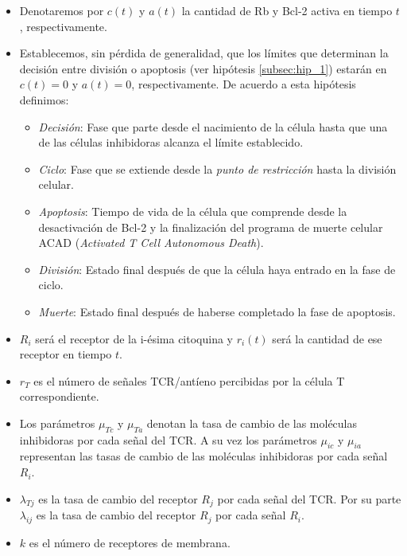 \begin{itemize}
	\item Denotaremos por \textit{$c(t)$} y \textit{$a(t)$} la cantidad de Rb y Bcl-2 activa en tiempo $t$, respectivamente.

	\item Establecemos, sin pérdida de generalidad, que los límites que determinan la decisión entre división o apoptosis (ver hipótesis \ref{subsec:hip_1}) estarán en $c(t)=0$ y $a(t)=0$, respectivamente. De acuerdo a esta hipótesis definimos: 
	
	\begin{itemize}
		\item \textit{Decisión}: Fase que parte desde el nacimiento de la célula hasta que una de las células inhibidoras alcanza el límite establecido.
		
		\item \textit{Ciclo}: Fase que se extiende desde la \textit{punto de restricción} hasta la división celular.
		
		\item \textit{Apoptosis}: Tiempo de vida de la célula que comprende desde la desactivación de Bcl-2 y la finalización del programa de muerte celular ACAD (\textit{Activated T Cell Autonomous Death}).
		
		\item \textit{División}: Estado final después de que la célula haya entrado en la fase de ciclo.
		
		\item \textit{Muerte}: Estado final después de haberse completado la fase de apoptosis.
	\end{itemize}

	\item \textit{$R_{i}$} será el receptor de la i-ésima citoquina y \textit{$r_{i}(t)$} será la cantidad de ese receptor en tiempo $t$. 
	\item $r_{T}$ es el número de señales TCR/antíeno percibidas por la célula T correspondiente.
	
	\item Los parámetros $\mu_{Tc}$ y $\mu_{Ta}$ denotan la tasa de cambio de las moléculas inhibidoras por cada señal del TCR. A su vez los parámetros $\mu_{ic}$ y $\mu_{ia}$ representan las tasas de cambio de las moléculas inhibidoras por cada señal $R_i$.
	
	\item $\lambda_{Tj}$ es la tasa de cambio del receptor $R_{j}$ por cada señal del TCR. Por su parte $\lambda_{ij}$ es la tasa de cambio del receptor $R_j$ por cada señal $R_i$.
	
	\item $k$ es el número de receptores de membrana.
\end{itemize} 

